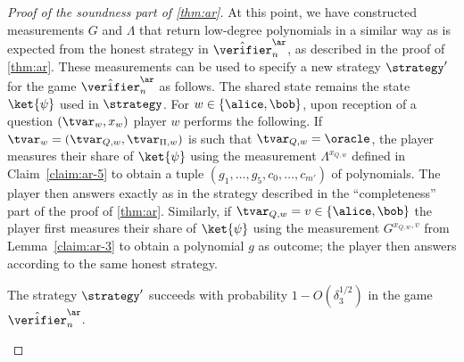 \begin{proof}[Proof of the soundness part of \cref{thm:ar}]
At this point, we have constructed measurements $G$ and $\Lambda$ that return
low-degree polynomials in a similar way as is expected from the honest strategy
in $\tvans_n$, as described in the proof of \cref{thm:ar}.
These measurements can be used to specify a new strategy $\strategy'$ for the
game $\tvans_n$ as follows.
The shared state remains the state $\ket{\psi}$ used in $\strategy$.
For $w\in \{\alice,\bob\}$, upon reception of a question $(\tvar_w,x_w)$ player
$w$ performs the following.
If $\tvar_w = (\tvar_{Q,w},\tvar_{\Pi,w})$ is such that $\tvar_{Q,w} = \oracle$,
the player measures their share of $\ket{\psi}$ using the measurement
$\Lambda^{x_{Q,w}}$ defined in Claim~\ref{claim:ar-5} to obtain a tuple
$(g_1,\ldots,g_5,c_0,\ldots,c_{m'})$ of polynomials.
The player then answers exactly as in the strategy described in the
``completeness'' part of the proof of \cref{thm:ar}.
Similarly, if $\tvar_{Q,w} = v \in \{\alice,\bob\}$ the player first measures
their share of $\ket{\psi}$ using the measurement $G^{x_{Q,w},v}$ from
Lemma~\ref{claim:ar-3} to obtain a polynomial $g$ as outcome; the player then
answers according to the same honest strategy.
	
\begin{lemma}\label{lem:ar-ar}
	The strategy $\strategy'$ succeeds with probability $1-O(\delta_3^{1/2})$ in the
  game $\tvans_n$.
\end{lemma}


\end{proof}
